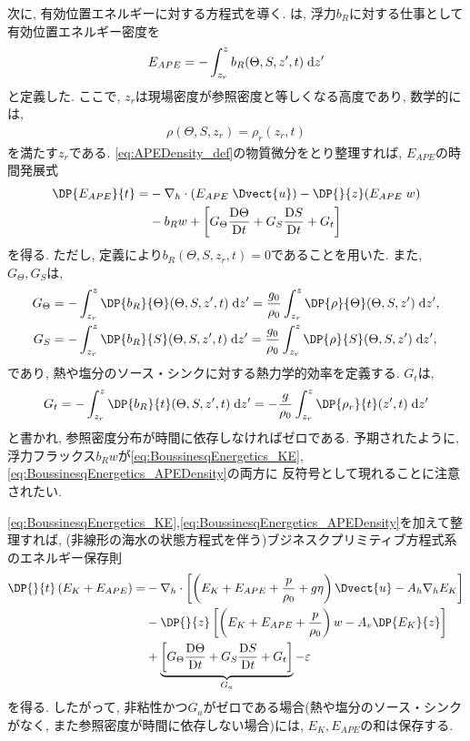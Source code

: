 次に, 有効位置エネルギーに対する方程式を導く.
\cite{tailleux2013available}は, 浮力$b_R$に対する仕事として有効位置エネルギー密度を
\begin{align}
 E_{APE} = - \int_{z_r}^z b_R(\Theta,S,z',t) \; {\mathrm d} z'
\label{eq:APEDensity_def}
\end{align}
と定義した.
ここで, $z_r$は現場密度が参照密度と等しくなる高度であり, 
数学的には, 
\begin{align}
  \rho(\Theta,S,z_r) = \rho_r(z_r,t)
\end{align}
を満たす$z_r$である.
\eqref{eq:APEDensity_def}の物質微分をとり整理すれば,
$E_{APE}$の時間発展式
\begin{align}
 \DP{E_{APE}}{t}
 =
 &- \nabla_h \cdot (E_{APE} \; \Dvect{u}) - \DP{}{z} (E_{APE} \; w) \\
 &- b_R w
 + \left[G_\Theta \DD{\Theta}{t} + G_S \DD{S}{t} + G_t\right]
\label{eq:BoussinesqEnergetics_APEDensity}
\end{align}
を得る.
ただし, 定義により$b_R(\Theta,S,z_r,t)=0$であることを用いた.
また, $G_\Theta, G_S$は,
\begin{align}
 G_\Theta &= - \int_{z_r}^z \DP{b_R}{\Theta}(\Theta,S,z',t) \Dd{z'}
           = \dfrac{g_0}{\rho_0} \int_{z_r}^z \DP{\rho}{\Theta}(\Theta,S,z') \Dd{z'}, \\
  G_S &= - \int_{z_r}^z \DP{b_R}{S}(\Theta,S,z',t) \Dd{z'}
       = \dfrac{g_0}{\rho_0} \int_{z_r}^z \DP{\rho}{S}(\Theta,S,z') \Dd{z'}, \\
\end{align}
であり, 熱や塩分のソース・シンクに対する熱力学的効率を定義する.
$G_t$は,
\begin{align}
 G_t = - \int_{z_r}^z \DP{b_R}{t}(\Theta,S,z',t)\Dd{z'}
     = - \dfrac{g}{\rho_0} \int_{z_r}^z \DP{\rho_r}{t}(z',t) \Dd{z'}
\end{align}
と書かれ,
参照密度分布が時間に依存しなければゼロである.
予期されたように, 浮力フラックス$b_R w$が\eqref{eq:BoussinesqEnergetics_KE}, \eqref{eq:BoussinesqEnergetics_APEDensity}の両方に
反符号として現れることに注意されたい. 

\eqref{eq:BoussinesqEnergetics_KE},\eqref{eq:BoussinesqEnergetics_APEDensity}を加えて整理すれば,
(非線形の海水の状態方程式を伴う)ブジネスクプリミティブ方程式系のエネルギー保存則
\begin{align}
 \DP{}{t} \left(E_K + E_{APE}\right)
 =
 &- \nabla_h \cdot \left[
        \left( E_K + E_{APE} + \dfrac{p}{\rho_0} + g\eta \right) \Dvect{u}
      - A_h \nabla_h E_K
    \right]               \nonumber \\
 &- \DP{}{z} \left[
        \left(E_K + E_{APE} + \dfrac{p}{\rho_0} \right)w
      - A_v \DP{E_K}{z}
    \right]              \nonumber \\
 &+ \underbrace{ \left[
      G_\Theta \DD{\Theta}{t}
    + G_S \DD{S}{t}
    + G_t
    \right] }_{G_a}
  - \varepsilon
\end{align}
を得る.
したがって, 非粘性かつ$G_a$がゼロである場合(熱や塩分のソース・シンクがなく, また参照密度が時間に依存しない場合)には,
$E_K,E_{APE}$の和は保存する.

